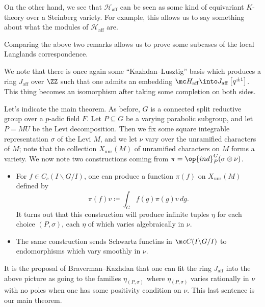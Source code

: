 \documentclass{article}
\begin{document}
\begin{remark}
	On the other hand, we see that $\mathcal H_{\mathrm{aff}}$ can be seen as some kind of equivariant $K$-theory over a Steinberg variety. For example, this allows us to say something about what the modules of $\mathcal H_{\mathrm{aff}}$ are.
\end{remark}
Comparing the above two remarks allows us to prove some subcases of the local Langlands correspondence.
\begin{remark}
	We note that there is once again some ``Kazhdan--Lusztig'' basis which produces a ring $J_{\mathrm{aff}}$ over $\ZZ$ such that one admits an embedding $\mc H_{\mathrm{aff}}\into J_{\mathrm{aff}}\left[q^{\pm1}\right]$. This thing becomes an isomorphism after taking some completion on both sides.
\end{remark}
Let's indicate the main theorem. As before, $G$ is a connected split reductive group over a $p$-adic field $F$. Let $P\subseteq G$ be a varying parabolic subgroup, and let $P=MU$ be the Levi decomposition. Then we fix some square integrable representation $\sigma$ of the Levi $M$, and we let $\nu$ vary over the unramified characters of $M$; note that the collection $X_{\mathrm{unr}}(M)$ of unramified characters on $M$ forms a variety. We now note two constructions coming from $\pi=\op{ind}_P^G(\sigma\otimes\nu)$.
\begin{itemize}
	\item For $f\in C_c(I\backslash G/I)$, one can produce a function $\pi(f)$ on $X_{\mathrm{unr}}(M)$ defined by
	\[\pi(f)v\coloneqq\int_Gf(g)\pi(g)v\,dg.\]
	It turns out that this construction will produce infinite tuples $\eta$ for each choice $(P,\sigma)$, each $\eta$ of which varies algebraically in $\nu$.
	\item The same construction sends Schwartz functins in $\mc C(I\backslash G/I)$ to endomorphisms which vary smoothly in $\nu$.
\end{itemize}
It is the proposal of Braverman--Kazhdan that one can fit the ring $J_{\mathrm{aff}}$ into the above picture as going to the families $\eta_{(P,\sigma)}$ where $\eta_{(P,\sigma)}$ varies rationally in $\nu$ with no poles when one has some positivity condition on $\nu$. This last sentence is our main theorem.
\end{document}
